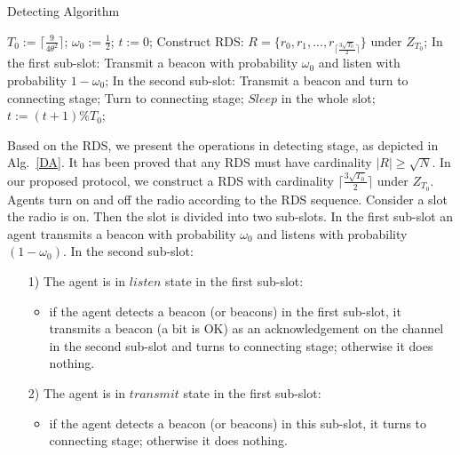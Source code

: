 \begin{algorithm}[t]
    \caption{Detecting Algorithm}
    \label{DA}
    \begin{algorithmic}[1]
    \STATE $T_0 := \lceil \frac{9}{4\theta^{2}} \rceil$; $\omega_0 :=\frac{1}{2}$; $t := 0$;
    \STATE Construct RDS: $R = \{r_0, r_1, ...,r_{\lceil 
    \frac{3\sqrt{T_0}}{2}  \rceil}\}$ under $Z_{T_0}$;
          \label{On}
            \STATE In the first sub-slot:
            \STATE Transmit a beacon with probability $\omega_0$
            and listen with probability $1-\omega_0$;
            \STATE In the second sub-slot:
                    \STATE Transmit a beacon and turn to connecting stage;
                \ENDIF
            \ELSE
                    \STATE Turn to connecting stage;
                \ENDIF
            \ENDIF
        \ELSE
                \STATE $Sleep$ in the whole slot;
        \ENDIF
        \STATE $t := (t + 1) \% T_0$;
    \ENDWHILE
    \end{algorithmic}
\end{algorithm}

Based on the RDS, we present the operations in detecting stage, as depicted in Alg.~\ref{DA}.
It has been proved that any RDS must have cardinality $|R| \geq \sqrt{N}$\cite{luk1997two}.
In our proposed protocol, we construct a RDS with cardinality $\lceil \frac{3\sqrt{T_0}}{2}  
\rceil$ under $Z_{T_0}$.
Agents turn on and off the radio according to the RDS sequence.
Consider a slot the radio is on. Then the slot is divided into two sub-slots. In the first sub-slot
an agent transmits a beacon with probability $\omega_0$ and listens with probability $(1-\omega_0)$.
In the second sub-slot: 
\begin{itemize}
    \item[1)] The agent is in $listen$ state in the first sub-slot:
    \begin{itemize}
    \item if the agent detects a beacon (or beacons) in the first sub-slot, it 
    transmits a beacon (a bit is OK) as an acknowledgement 
    on the channel in the second sub-slot and turns to 
    connecting stage; otherwise it does nothing. 
    \end{itemize}
    \item[2)] The agent is in $transmit$ state in the first sub-slot:
    \begin{itemize}
    \item if the agent detects a beacon (or beacons) in this sub-slot,
    it turns to connecting stage; otherwise it does nothing.
    \end{itemize}
\end{itemize}

